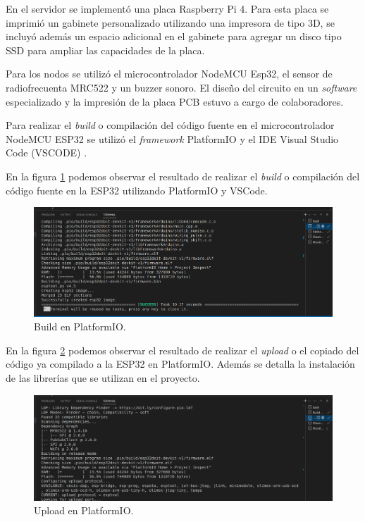 En el servidor se implementó una placa Raspberry Pi 4. Para esta placa se imprimió un gabinete personalizado utilizando una impresora de tipo 3D, se incluyó además un espacio adicional en el gabinete para agregar un disco tipo SSD para ampliar las capacidades de la placa.


Para los nodos se utilizó el microcontrolador NodeMCU Esp32, el sensor de radiofrecuenta MRC522 y un buzzer sonoro. El diseño del circuito en un \textit{software} especializado y la impresión de la placa PCB estuvo a cargo de colaboradores.  

Para realizar el \textit{build} o compilación del código fuente en el microcontrolador NodeMCU ESP32 se utilizó el \textit{framework} PlatformIO \cite{platformio} y el IDE Visual Studio Code (VSCODE) \cite{vscode}.

En la figura \ref{fig:platformio-build} podemos observar el resultado de realizar el \textit{build}  o compilación del código fuente en la ESP32 utilizando PlatformIO y VSCode.

\begin{figure}[H]
	\centering
	\includegraphics[width=\textwidth]{./Figures/platformio-build.png}
	\caption{Build en PlatformIO.}
	\label{fig:platformio-build}
\end{figure}

En la figura \ref{fig:platformio-upload} podemos observar el resultado de realizar el \textit{upload} o el copiado del código ya compilado a la ESP32 en PlatformIO. Además se detalla la instalación de las librerías que se utilizan en el proyecto.

\begin{figure}[H]
	\centering
	\includegraphics[width=\textwidth]{./Figures/platformio-upload.png}
	\caption{Upload en PlatformIO.}
	\label{fig:platformio-upload}
\end{figure}


